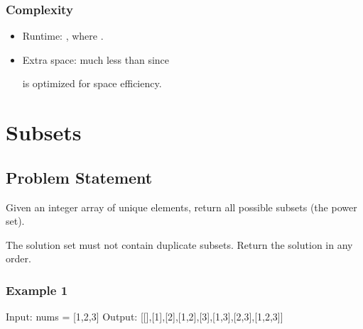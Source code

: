 \documentclass[letterpaper,12pt,english]{book}
\begin{document}
\subsubsection{Complexity}
\label{\detokenize{Mathematics/09_MTH_565_Array_Nesting:complexity}}\begin{itemize}
\item {} 
\sphinxAtStartPar
Runtime: , where .

\item {} 
\sphinxAtStartPar
Extra space: much less than  since %
\begin{footnote}[135]\sphinxAtStartFootnote
{}
%
\end{footnote} is optimized for space efficiency.

\end{itemize}

\sphinxstepscope


\section{Subsets}
\label{\detokenize{Mathematics/09_MTH_78_Subsets:subsets}}\label{\detokenize{Mathematics/09_MTH_78_Subsets::doc}}

\subsection{Problem Statement\sphinxfootnotemark[136]}
\label{\detokenize{Mathematics/09_MTH_78_Subsets:problem-statement}}%
\begin{footnotetext}[136]\sphinxAtStartFootnote
{}
%
\end{footnotetext}\ignorespaces 
\sphinxAtStartPar
Given an integer array  of unique elements, return all possible subsets (the power set).

\sphinxAtStartPar
The solution set must not contain duplicate subsets. Return the solution in any order.


\subsubsection{Example 1}
\label{\detokenize{Mathematics/09_MTH_78_Subsets:example-1}}
\begin{sphinxVerbatim}[commandchars=\\\{\}]
Input: nums = [1,2,3]
Output: [[],[1],[2],[1,2],[3],[1,3],[2,3],[1,2,3]]
\end{sphinxVerbatim}
\end{document}
